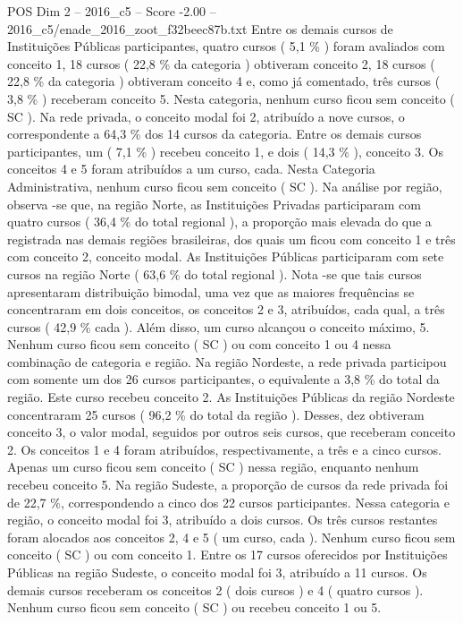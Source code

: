 \begin{textsample}{POS Dim 2 – 2016\_c5 – Score -2.00 – 2016\_c5/enade\_2016\_zoot\_f32beec87b.txt}
Entre os demais cursos de Instituições Públicas participantes, quatro cursos ( 5,1 \% ) foram avaliados com conceito 1, 18 cursos ( 22,8 \% da categoria ) obtiveram conceito 2, 18 cursos ( 22,8 \% da categoria ) obtiveram conceito 4 e, como já comentado, três cursos ( 3,8 \% ) receberam conceito 5.
Nesta categoria, nenhum curso ficou sem conceito ( SC ).
Na rede privada, o conceito modal foi 2, atribuído a nove cursos, o correspondente a 64,3 \% dos 14 cursos da categoria.
Entre os demais cursos participantes, um ( 7,1 \% ) recebeu conceito 1, e dois ( 14,3 \% ), conceito 3.
Os conceitos 4 e 5 foram atribuídos a um curso, cada.
Nesta Categoria Administrativa, nenhum curso ficou sem conceito ( SC ).
Na análise por região, observa -se que, na região Norte, as Instituições Privadas participaram com quatro cursos ( 36,4 \% do total regional ), a proporção mais elevada do que a registrada nas demais regiões brasileiras, dos quais um ficou com conceito 1 e três com conceito 2, conceito modal.
As Instituições Públicas participaram com sete cursos na região Norte ( 63,6 \% do total regional ).
Nota -se que tais cursos apresentaram distribuição bimodal, uma vez que as maiores frequências se concentraram em dois conceitos, os conceitos 2 e 3, atribuídos, cada qual, a três cursos ( 42,9 \% cada ).
Além disso, um curso alcançou o conceito máximo, 5.
Nenhum curso ficou sem conceito ( SC ) ou com conceito 1 ou 4 nessa combinação de categoria e região.
Na região Nordeste, a rede privada participou com somente um dos 26 cursos participantes, o equivalente a 3,8 \% do total da região.
Este curso recebeu conceito 2.
As Instituições Públicas da região Nordeste concentraram 25 cursos ( 96,2 \% do total da região ).
Desses, dez obtiveram conceito 3, o valor modal, seguidos por outros seis cursos, que receberam conceito 2.
Os conceitos 1 e 4 foram atribuídos, respectivamente, a três e a cinco cursos.
Apenas um curso ficou sem conceito ( SC ) nessa região, enquanto nenhum recebeu conceito 5.
Na região Sudeste, a proporção de cursos da rede privada foi de 22,7 \%, correspondendo a cinco dos 22 cursos participantes.
Nessa categoria e região, o conceito modal foi 3, atribuído a dois cursos.
Os três cursos restantes foram alocados aos conceitos 2, 4 e 5 ( um curso, cada ).
Nenhum curso ficou sem conceito ( SC ) ou com conceito 1.
Entre os 17 cursos oferecidos por Instituições Públicas na região Sudeste, o conceito modal foi 3, atribuído a 11 cursos.
Os demais cursos receberam os conceitos 2 ( dois cursos ) e 4 ( quatro cursos ).
Nenhum curso ficou sem conceito ( SC ) ou recebeu conceito 1 ou 5.

\end{textsample}
